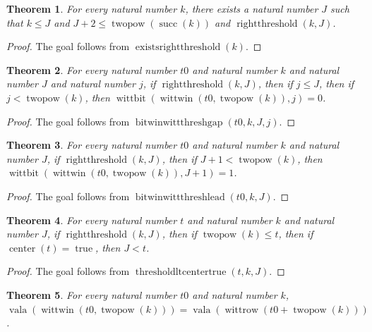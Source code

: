 \documentclass[11pt]{article}
\newtheorem{theorem}{Theorem}[section]
\theoremstyle{definition}
\begin{document}
\begin{theorem}
\label{ll:paper:right-threshold-exists}
For every natural number \(k\), there exists a natural number \(J\) such that \(k \le J\) and \(J + 2 \le \operatorname{twopow}(\operatorname{succ}(k))\) and \(\operatorname{rightthreshold}(k, J)\).
\end{theorem}
\begin{proof}
The goal follows from \(\operatorname{existsrightthreshold}(k)\).
\end{proof}
\begin{theorem}
\label{ll:paper:winwitt-threshold-gap}
For every natural number \(t0\) and natural number \(k\) and natural number \(J\) and natural number \(j\), if \(\operatorname{rightthreshold}(k, J)\), then if \(j \le J\), then if \(j < \operatorname{twopow}(k)\), then \(\operatorname{wittbit}(\operatorname{wittwin}(t0, \operatorname{twopow}(k)), j) = 0\).
\end{theorem}
\begin{proof}
The goal follows from \(\operatorname{bitwinwittthreshgap}(t0, k, J, j)\).
\end{proof}
\begin{theorem}
\label{ll:paper:winwitt-threshold-lead}
For every natural number \(t0\) and natural number \(k\) and natural number \(J\), if \(\operatorname{rightthreshold}(k, J)\), then if \(J + 1 < \operatorname{twopow}(k)\), then \(\operatorname{wittbit}(\operatorname{wittwin}(t0, \operatorname{twopow}(k)), J + 1) = 1\).
\end{theorem}
\begin{proof}
The goal follows from \(\operatorname{bitwinwittthreshlead}(t0, k, J)\).
\end{proof}
\begin{theorem}
\label{ll:paper:threshold-lt-center-black}
For every natural number \(t\) and natural number \(k\) and natural number \(J\), if \(\operatorname{rightthreshold}(k, J)\), then if \(\operatorname{twopow}(k) \le t\), then if \(\operatorname{center}(t) = \operatorname{true}\), then \(J < t\).
\end{theorem}
\begin{proof}
The goal follows from \(\operatorname{thresholdltcentertrue}(t, k, J)\).
\end{proof}
\begin{theorem}
\label{ll:paper:winwitt-cyclotomic-first}
For every natural number \(t0\) and natural number \(k\), \(\operatorname{vala}(\operatorname{wittwin}(t0, \operatorname{twopow}(k))) = \operatorname{vala}(\operatorname{wittrow}(t0 + \operatorname{twopow}(k)))\).
\end{theorem}
\end{document}
